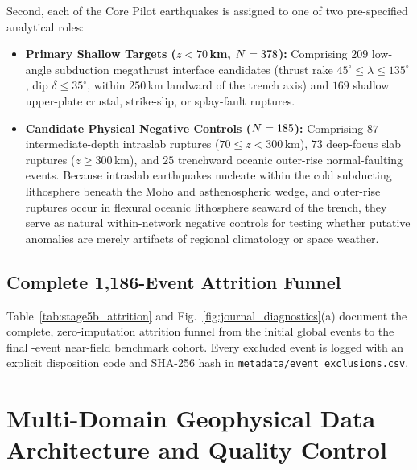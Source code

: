 ﻿\documentclass[journal]{IEEEtran}
\begin{document}
Second, each of the \LgCorePilotIncluded{} Core Pilot earthquakes is assigned to one of two pre-specified analytical roles:
\begin{itemize}
    \item \textbf{Primary Shallow Targets ($z < 70$\,km, $N = 378$):} Comprising $209$ low-angle subduction megathrust interface candidates (thrust rake $45^\circ \le \lambda \le 135^\circ$, dip $\delta \le 35^\circ$, within $250$\,km landward of the trench axis) and $169$ shallow upper-plate crustal, strike-slip, or splay-fault ruptures.
    \item \textbf{Candidate Physical Negative Controls ($N = 185$):} Comprising $87$ intermediate-depth intraslab ruptures ($70 \le z < 300$\,km), $73$ deep-focus slab ruptures ($z \ge 300$\,km), and $25$ trenchward oceanic outer-rise normal-faulting events. Because intraslab earthquakes nucleate within the cold subducting lithosphere beneath the Moho and asthenospheric wedge, and outer-rise ruptures occur in flexural oceanic lithosphere seaward of the trench, they serve as natural within-network negative controls for testing whether putative anomalies are merely artifacts of regional climatology or space weather.
\end{itemize}

\subsection{Complete 1,186-Event Attrition Funnel}
Table~\ref{tab:stage5b_attrition} and Fig.~\ref{fig:journal_diagnostics}(a) document the complete, zero-imputation attrition funnel from the initial \LgTotalGlobalEvents{} global events to the final \LgPairedTierOneTotal{}-event near-field benchmark cohort. Every excluded event is logged with an explicit disposition code and SHA-256 hash in \texttt{metadata/event\_exclusions.csv}.



\section{Multi-Domain Geophysical Data Architecture and Quality Control}
\end{document}
